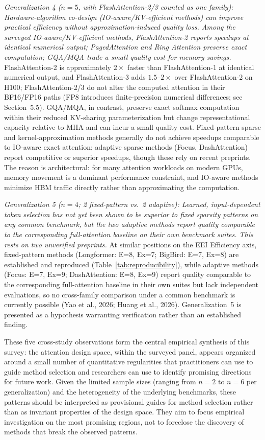 \documentclass[10pt,twocolumn]{article}
\begin{document}
\textit{Generalization 4 ($n = 5$, with FlashAttention-2/3 counted as one family): Hardware-algorithm co-design (IO-aware/KV-efficient methods) can improve practical efficiency without approximation-induced quality loss. Among the surveyed IO-aware/KV-efficient methods, FlashAttention-2 reports speedups at identical numerical output; PagedAttention and Ring Attention preserve exact computation; GQA/MQA trade a small quality cost for memory savings.} FlashAttention-2 is approximately $2\times$ faster than FlashAttention-1 at identical numerical output, and FlashAttention-3 adds $1.5$--$2\times$ over FlashAttention-2 on H100; FlashAttention-2/3 do not alter the computed attention in their BF16/FP16 paths (FP8 introduces finite-precision numerical differences; see Section~5.5). GQA/MQA, in contrast, preserve exact softmax computation within their reduced KV-sharing parameterization but change representational capacity relative to MHA and can incur a small quality cost. Fixed-pattern sparse and kernel-approximation methods generally do not achieve speedups comparable to IO-aware exact attention; adaptive sparse methods (Focus, DashAttention) report competitive or superior speedups, though these rely on recent preprints. The reason is architectural: for many attention workloads on modern GPUs, memory movement is a dominant performance constraint, and IO-aware methods minimize HBM traffic directly rather than approximating the computation.

\textit{Generalization 5 ($n = 4$; 2 fixed-pattern vs.\ 2 adaptive): Learned, input-dependent token selection has not yet been shown to be superior to fixed sparsity patterns on any common benchmark, but the two adaptive methods report quality comparable to the corresponding full-attention baseline on their own benchmark suites. This rests on two unverified preprints.} At similar positions on the EEI Efficiency axis, fixed-pattern methods (Longformer: E=8, Ex=7; BigBird: E=7, Ex=8) are established and reproduced (Table~\ref{tab:reproducibility}), while adaptive methods (Focus: E=7, Ex=9; DashAttention: E=8, Ex=9) report quality comparable to the corresponding full-attention baseline in their own suites but lack independent evaluations, so no cross-family comparison under a common benchmark is currently possible (Yao et al., 2026; Huang et al., 2026). Generalization~5 is presented as a hypothesis warranting verification rather than an established finding.

These five cross-study observations form the central empirical synthesis of this survey: the attention design space, within the surveyed panel, appears organized around a small number of quantitative regularities that practitioners can use to guide method selection and researchers can use to identify promising directions for future work. Given the limited sample sizes (ranging from $n = 2$ to $n = 6$ per generalization) and the heterogeneity of the underlying benchmarks, these patterns should be interpreted as provisional guides for method selection rather than as invariant properties of the design space. They aim to focus empirical investigation on the most promising regions, not to foreclose the discovery of methods that break the observed patterns.
\end{document}
